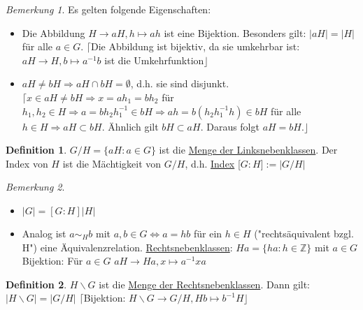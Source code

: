\documentclass[12pt]{scrartcl}%
\theoremstyle{definition}
\newtheorem*{defn}{Definition}
\theoremstyle{remark}
\newtheorem*{nb}{Bemerkung}
\begin{document}
\begin{nb}
	Es gelten folgende Eigenschaften: 
	\begin{itemize}
		\item Die Abbildung $H \rightarrow aH, h \mapsto ah$ ist eine Bijektion. Besonders gilt: $\vert aH \vert = \vert H \vert$ für alle $a \in G$. \newline $\lceil$Die Abbildung ist bijektiv, da sie umkehrbar ist: $aH \rightarrow H, b \mapsto a^{-1}b$ ist die Umkehrfunktion$\rfloor$
		\item $aH \neq bH \Rightarrow aH \cap bH = \emptyset$, d.h. sie sind disjunkt. \newline $\lceil x \in aH \neq bH \Rightarrow x = ah_{1} = bh_{2}$ für $h_{1},h_{2} \in H \Rightarrow a=bh_{2}h_{1}^{-1} \in bH \Rightarrow ah= b(h_{2}h_{1}^{-1}h) \in bH$ für alle $h \in H \Rightarrow aH \subset bH$. Ähnlich gilt $bH \subset aH$. Daraus folgt $aH=bH.\rfloor$
	\end{itemize}
\end{nb}

\begin{defn}
	$G/H = \lbrace aH : a \in G \rbrace$ ist die \underline{Menge der Linksnebenklassen}. \newline Der Index von $H$ ist die Mächtigkeit von $G/H$, d.h. \underline{Index} [$G:H$]$:=\vert G/H \vert$
\end{defn}

\begin{nb}
	\begin{itemize}
	 	\item $\vert G \vert = [G:H]\vert H\vert$
	 	\item Analog ist $a \sim_{H} b$ mit $a,b \in G \Leftrightarrow a=hb$ für ein $h \in H$ ("rechtsäquivalent bzgl. H") eine Äquivalenzrelation. \newline \underline{Rechtsnebenklassen}: $Ha=\lbrace ha : h \in \mathbb{Z} \rbrace$ mit $a \in G$ \newline Bijektion: Für $a \in G$ $aH \rightarrow Ha, x \mapsto a^{-1}xa$
	\end{itemize}
\end{nb}

\begin{defn}
	$H \backslash G$ ist die \underline{Menge der Rechtsnebenklassen}. Dann gilt: $\vert H \backslash G \vert = \vert G/H \vert$ \newline $\lceil$Bijektion: $H \backslash G \rightarrow G/H, Hb \mapsto b^{-1}H \rfloor$
\end{defn}
\end{document}
